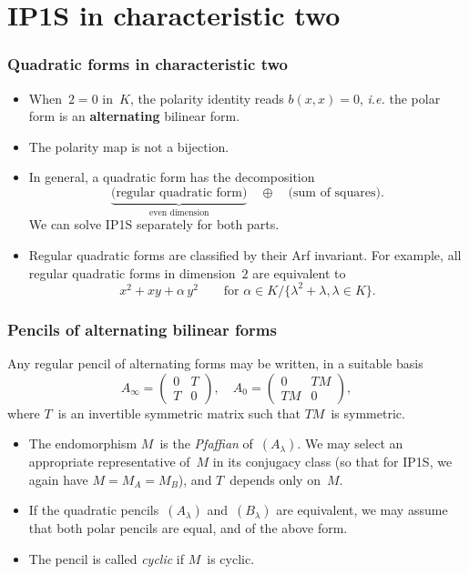 \documentclass{beamer}%
\def\strong#1{{\bf\color{rouge}#1}}
\def\mat#1{\begin{pmatrix}#1\end{pmatrix}}
\begin{document}
\section{IP1S in characteristic two}
\begin{frame}\frametitle{Quadratic forms in characteristic two}%
\begin{itemize}
\item When~$2 = 0$ in~$K$, the polarity identity reads $b(x,x) = 0$,
\emph{i.e.} the polar form is an \strong{alternating} bilinear form.
\item The polarity map is not a bijection.
\item In general, a quadratic form has the decomposition
\begin{equation*}
\underbrace{\text{(regular quadratic form)}}_{\text{even dimension}}
\quad⊕\quad {\text{(sum of squares)}}.
\end{equation*}
We can solve IP1S separately for both parts.
\item Regular quadratic forms are classified by their Arf invariant. For
example, all regular quadratic forms in dimension~$2$ are equivalent to
\begin{equation*}
x^2+xy+α\,y^2 \qquad \text{for $α ∈ K / \{ λ^2 + λ, λ ∈ K \}$}.
\end{equation*}
\end{itemize}
\end{frame}%
\begin{frame}\frametitle{Pencils of alternating bilinear forms}%
\begin{theorem}
Any regular pencil of alternating forms may be written, in a
suitable basis
\begin{equation*}
A_{∞} = \mat{0 & T\\T & 0}, \quad A_{0} = \mat{0 & TM\\TM & 0},
\end{equation*}
where $T$~is an invertible symmetric matrix such that $TM$~is symmetric.
\end{theorem}
\begin{itemize}
\item The endomorphism $M$~is the \emph{Pfaffian} of~$(A_{λ})$. We may
select an appropriate representative of~$M$ in its conjugacy class (so
that for IP1S, we again have $M = M_A = M_B$), and $T$~depends only
on~$M$.
\item If the quadratic pencils~$(A_{λ})$ and~$(B_{λ})$ are equivalent, we
may assume that both polar pencils are equal, and of the above form.
\item The pencil is called \emph{cyclic} if $M$~is cyclic.
\end{itemize}
\end{frame}%
\end{document}
